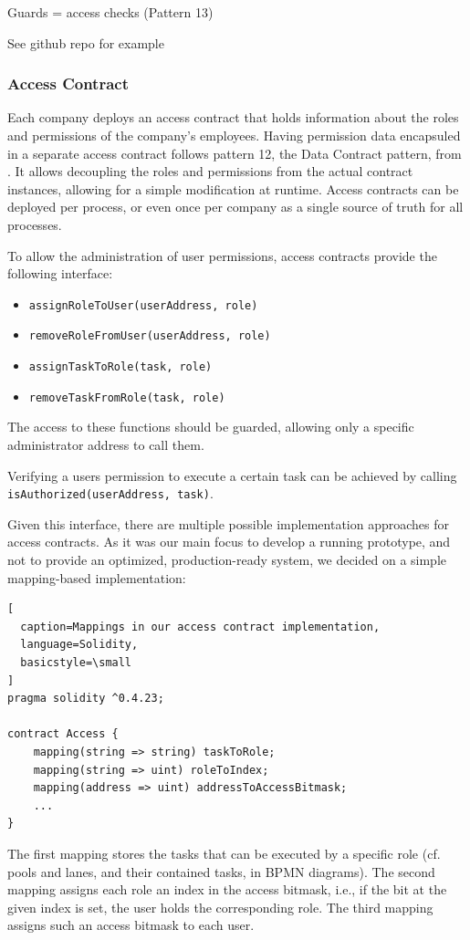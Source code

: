 \documentclass[runningheads]{llncs}
\begin{document}
Guards = access checks (Pattern 13)

See github repo for example %

\subsubsection{Access Contract}

Each company deploys an access contract that holds information about the roles and permissions of the company's employees.
Having permission data encapsuled in a separate access contract follows pattern 12, the Data Contract pattern, from \cite{xu2018pattern}.
It allows decoupling the roles and permissions from the actual contract instances, allowing for a simple modification at runtime.
Access contracts can be deployed per process, or even once per company as a single source of truth for all processes.

To allow the administration of user permissions, access contracts provide the following interface:
\begin{itemize}
	\item
	      \texttt{assignRoleToUser(userAddress, role)}
	\item
	      \texttt{removeRoleFromUser(userAddress, role)}
	\item
	      \texttt{assignTaskToRole(task, role)}
	\item
	      \texttt{removeTaskFromRole(task, role)}
\end{itemize}
The access to these functions should be guarded, allowing only a specific administrator address to call them.

Verifying a users permission to execute a certain task can be achieved by calling \texttt{isAuthorized(userAddress, task)}.
\newline

Given this interface, there are multiple possible implementation approaches for access contracts.
As it was our main focus to develop a running prototype, and not to provide an optimized, production-ready system, we decided on a simple mapping-based implementation:
\begin{lstlisting}[
  caption=Mappings in our access contract implementation,
  language=Solidity,
  basicstyle=\small
]
pragma solidity ^0.4.23;

contract Access {
    mapping(string => string) taskToRole;
    mapping(string => uint) roleToIndex;
    mapping(address => uint) addressToAccessBitmask;
    ...
}
\end{lstlisting}
The first mapping stores the tasks that can be executed by a specific role (cf. pools and lanes, and their contained tasks, in BPMN diagrams).
The second mapping assigns each role an index in the access bitmask, i.e., if the bit at the given index is set, the user holds the corresponding role.
The third mapping assigns such an access bitmask to each user.
\end{document}

